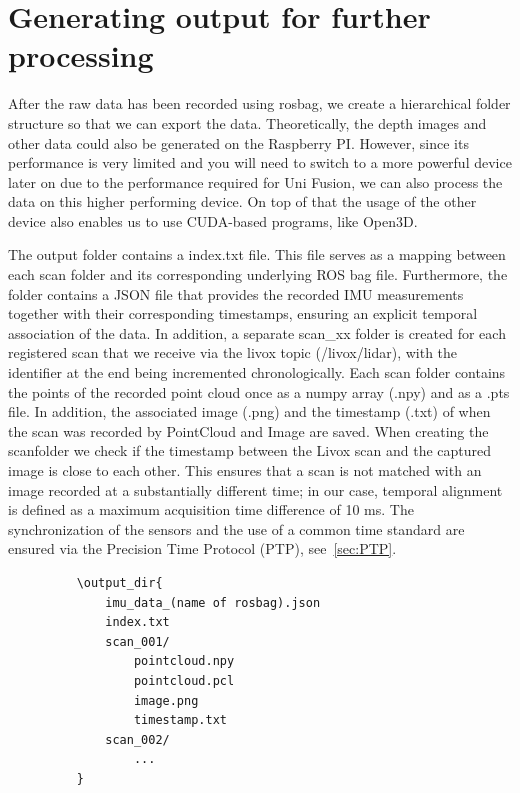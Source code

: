 \documentclass[english, bachelor, utf8]{base/thesis_telematics}
\begin{document}
\section*{Generating output for further processing}

After the raw data has been recorded using rosbag, we create a hierarchical folder structure so 
that we can export the data. Theoretically, the depth images and other data could also be generated on 
the Raspberry PI. However, since its performance is very limited and you will need to switch to a more 
powerful device later on due to the performance required for Uni Fusion, we can also process the data on 
this higher performing device. On top of that the usage of the other device also enables us to use
CUDA-based programs, like Open3D.

The output folder contains a {index.txt} file. This file serves as a mapping between each scan folder
and its corresponding underlying ROS bag file. Furthermore, the folder contains a JSON file that provides
the recorded IMU measurements together with their corresponding timestamps, ensuring an explicit temporal association of the data.
In addition, a separate scan\_xx folder is created for each registered scan that we receive via 
the livox topic (/livox/lidar), with the identifier at the end being incremented 
chronologically. Each scan folder contains the points of the recorded point cloud once as a numpy array 
(.npy) and as a .pts file. In addition, the associated image (.png) and the 
timestamp (.txt) of when the scan was recorded by PointCloud and Image are saved.
When creating the scanfolder we check if the timestamp between the Livox scan and the captured image
is close to each other. This ensures that a scan is not matched with an image recorded at a substantially
different time; in our case, temporal alignment is defined as a maximum acquisition time difference of 10 ms.
The synchronization of the sensors and the use of a common time standard are ensured via the Precision Time 
Protocol (PTP), see~\ref{sec:PTP}.

\begin{figure}[ht!]
    \begin{verbatim}
    \output_dir{
        imu_data_(name of rosbag).json
        index.txt
        scan_001/
            pointcloud.npy
            pointcloud.pcl
            image.png
            timestamp.txt
        scan_002/
            ...
    }
\end{verbatim}
\end{figure}
\end{document}
